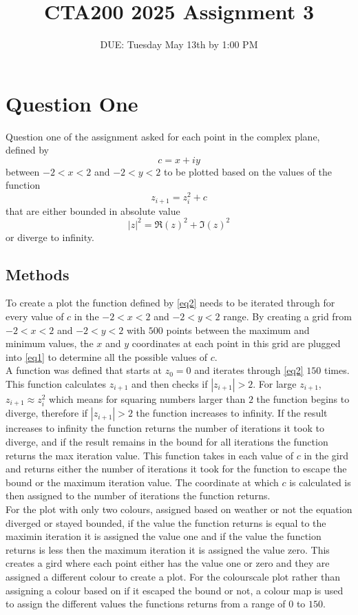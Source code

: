 \documentclass{article}
\title{CTA200 2025 Assignment 3}
\author[1]{DUE: Tuesday May 13th by 1:00 PM}
\date{}
\begin{document}
\maketitle

\section{Question One}

Question one of the assignment asked for each point in the complex plane, defined by
\begin{equation}
    c=x+iy    
\label{eq1}
\end{equation}
between $-2<x<2$ and $-2<y<2$ to be plotted based on the values of the function 
\begin{equation}
    z_{i+1}=z_i^2+c
\label{eq2}
\end{equation}
that are either bounded in absolute value 
\begin{equation}
    |z|^2=\Re(z)^2 + \Im(z)^2  
\label{eq3}
\end{equation}
 or diverge to infinity.  

\subsection{Methods}

To create a plot the function defined by \autoref{eq2} needs to be iterated through for every value of $c$ in the $-2<x<2$ and $-2<y<2$ range.  By creating a grid from $-2<x<2$ and $-2<y<2$ with $500$ points between the maximum and minimum values, the $x$ and $y$ coordinates at each point in this grid are plugged into \autoref{eq1} to determine all the possible values of $c$. \\
A function was defined that starts at $z_0=0$ and iterates through \autoref{eq2} $150$ times. This function calculates $z_{i+1}$ and then checks if $|z_{i+1}| > 2$. For large $z_{i+1}$, $z_{i+1}\approx z_i^2$ which means for squaring numbers larger than $2$ the function begins to diverge, therefore if $|z_{i+1}| > 2$ the function increases to infinity. If the result increases to infinity the function returns the number of iterations it took to diverge, and if the result remains in the bound for all iterations the function returns the max iteration value. This function takes in each value of $c$ in the gird and returns either the number of iterations it took for the function to escape the bound or the maximum iteration value. The coordinate at which $c$ is calculated is then assigned to the number of iterations the function returns. \\
For the plot with only two colours, assigned based on weather or not the equation diverged or stayed bounded, if the value the function returns is equal to the maximin iteration it is assigned the value one and if the value the function returns is less then the maximum iteration it is assigned the value zero. This creates a gird where each point either has the value one or zero and they are assigned a different colour to create a plot. For the colourscale plot rather than assigning a colour based on if it escaped the bound or not, a colour map is used to assign the different values the functions returns from a range of $0$ to $150$. 
\end{document}
